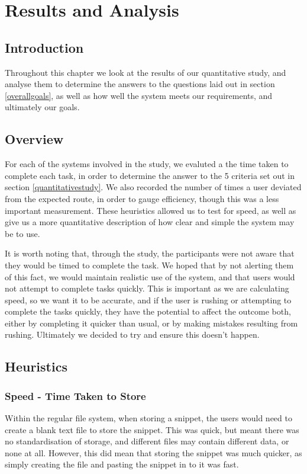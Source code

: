 \chapter{Results and Analysis}

\section{Introduction}
Throughout this chapter we look at the results of our quantitative study, and analyse them to determine the answers to the questions laid out in section \ref{overallgoals}, as well as how well the system meets our requirements, and ultimately our goals. 

\section{Overview}
For each of the systems involved in the study, we evaluted a the time taken to complete each task, in order to determine the answer to the 5 criteria set out in section \ref{quantitativestudy}.
We also recorded the number of times a user deviated from the expected route, in order to gauge efficiency, though this was a less important measurement.
These heuristics allowed us to test for speed, as well as give us a more quantitative description of how clear and simple the system may be to use.

It is worth noting that, through the study, the participants were not aware that they would be timed to complete the task.
We hoped that by not alerting them of this fact, we would maintain realistic use of the system, and that users would not attempt to complete tasks quickly.
This is important as we are calculating speed, so we want it to be accurate, and if the user is rushing or attempting to complete the tasks quickly, they have the potential to affect the outcome both, either by completing it quicker than usual, or by making mistakes resulting from rushing.
Ultimately we decided to try and ensure this doesn't happen.

\section{Heuristics}

\subsection{Speed - Time Taken to Store} \label{storespeed}
Within the regular file system, when storing a snippet, the users would need to create a blank text file to store the snippet. This was quick, but meant there was no standardisation of storage, and different files may contain different data, or none at all. 
However, this did mean that storing the snippet was much quicker, as simply creating the file and pasting the snippet in to it was fast.

